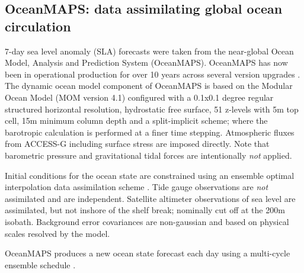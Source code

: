 \subsection{OceanMAPS: data assimilating global ocean circulation}
\label{sec:oceanmaps}
7-day sea level anomaly (SLA) forecasts were taken from the near-global Ocean Model, Analysis and Prediction System (OceanMAPS).
OceanMAPS has now been in operational production for over 10 years across several version upgrades  
\citep{Brassington:2007ut,NMOC:2007wq,BureauofMeterology:2011ta,Brassington:2012wm}.
The dynamic ocean model component of OceanMAPS is based on the Modular Ocean Model (MOM version 4.1) \citep{Griffies:2008vh} configured with a 0.1x0.1 degree regular structured horizontal resolution, hydrostatic free surface, 51 z-levels with 5m top cell, 15m minimum column depth and a split-implicit scheme; where the barotropic calculation is performed at a finer time stepping. 
Atmospheric fluxes from ACCESS-G including surface stress are imposed directly.
Note that barometric pressure and gravitational tidal forces are intentionally \textit{not} applied.

Initial conditions for the ocean state are constrained using an ensemble optimal interpolation data assimilation scheme \citep{Oke:2008wr, sakov:2014}. 
Tide gauge observations are \textit{not} assimilated and are independent.   
Satellite altimeter observations of sea level are assimilated, but not inshore of the shelf break; nominally cut off at the 200m isobath. 
Background error covariances are non-gaussian and based on physical scales resolved by the model.

OceanMAPS produces a new ocean state forecast each day using a multi-cycle ensemble schedule \citep{GaryBBrassington:2013jw}.

